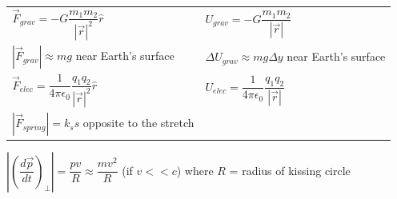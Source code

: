 \begin{tabular}{ll}
	
	
	$\vec F_{grav} = -G \dfrac{m_{1} m_{2}}{\left| \vec r \right|^2} \hat{r}$ &
	$U_{grav} = -G \dfrac{m_1 m_2}{\left| \vec r \right|}$ \\
	\vspace*{11pt}
	
	$\left| \vec F_{grav} \right| \approx m g$ near Earth's surface & $\Delta U_{grav} \approx mg \Delta y$ near Earth's surface\\
	\vspace*{5 pt}
	
	$\vec F_{elec} = \dfrac{1}{4 \pi \epsilon_{0}} \dfrac{q_{1} q_{2}}{\left| \vec r \right|^2} \hat{r}$  &
	$U_{elec} = \dfrac{1}{4 \pi \epsilon_0} \dfrac{q_1 q_2}{\left| \vec r \right|}$\\
	
	\vspace{5 pt}
	$\left| \vec F _{spring}\right| = k_{s} s$ opposite to the stretch \\
	
\end{tabular}

%
%

\vspace{5 pt}
$\left| \left(\dfrac{d\vec p}{dt}\right)_\bot\right| = \dfrac{p v}{R} \approx \dfrac{m v^2}{R}$ (if $v << c$) where $R$ = radius of kissing circle\\

